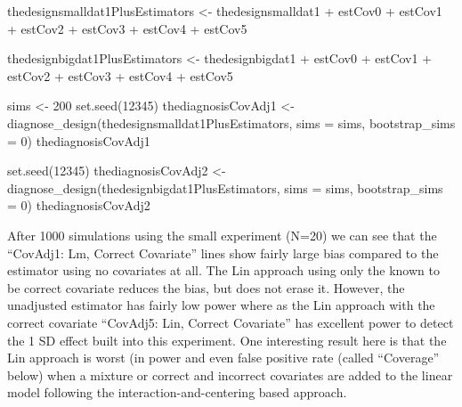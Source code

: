 \documentclass[
  12pt,
]{book}
\newenvironment{Shaded}{\begin{snugshade}}{\end{snugshade}}
\newcommand{\AttributeTok}[1]{\textcolor[rgb]{0.77,0.63,0.00}{#1}}
\newcommand{\DecValTok}[1]{\textcolor[rgb]{0.00,0.00,0.81}{#1}}
\newcommand{\FunctionTok}[1]{\textcolor[rgb]{0.00,0.00,0.00}{#1}}
\newcommand{\NormalTok}[1]{#1}
\newcommand{\OtherTok}[1]{\textcolor[rgb]{0.56,0.35,0.01}{#1}}
\newcommand{\SpecialCharTok}[1]{\textcolor[rgb]{0.00,0.00,0.00}{#1}}
\theoremstyle{definition}
\theoremstyle{definition}
\theoremstyle{definition}
\theoremstyle{remark}
\begin{document}
\begin{Shaded}
\begin{Highlighting}[]
\NormalTok{thedesignsmalldat1PlusEstimators }\OtherTok{\textless{}{-}}\NormalTok{ thedesignsmalldat1 }\SpecialCharTok{+}\NormalTok{ estCov0 }\SpecialCharTok{+}\NormalTok{ estCov1 }\SpecialCharTok{+}\NormalTok{ estCov2 }\SpecialCharTok{+}
\NormalTok{  estCov3 }\SpecialCharTok{+}\NormalTok{ estCov4 }\SpecialCharTok{+}\NormalTok{ estCov5}

\NormalTok{thedesignbigdat1PlusEstimators }\OtherTok{\textless{}{-}}\NormalTok{ thedesignbigdat1 }\SpecialCharTok{+}\NormalTok{ estCov0 }\SpecialCharTok{+}\NormalTok{ estCov1 }\SpecialCharTok{+}\NormalTok{ estCov2 }\SpecialCharTok{+}
\NormalTok{  estCov3 }\SpecialCharTok{+}\NormalTok{ estCov4 }\SpecialCharTok{+}\NormalTok{ estCov5}
\end{Highlighting}
\end{Shaded}

\begin{Shaded}
\begin{Highlighting}[]
\NormalTok{sims }\OtherTok{\textless{}{-}} \DecValTok{200}
\FunctionTok{set.seed}\NormalTok{(}\DecValTok{12345}\NormalTok{)}
\NormalTok{thediagnosisCovAdj1 }\OtherTok{\textless{}{-}} \FunctionTok{diagnose\_design}\NormalTok{(thedesignsmalldat1PlusEstimators, }\AttributeTok{sims =}\NormalTok{ sims, }\AttributeTok{bootstrap\_sims =} \DecValTok{0}\NormalTok{)}
\NormalTok{thediagnosisCovAdj1}
\end{Highlighting}
\end{Shaded}

\begin{Shaded}
\begin{Highlighting}[]
\FunctionTok{set.seed}\NormalTok{(}\DecValTok{12345}\NormalTok{)}
\NormalTok{thediagnosisCovAdj2 }\OtherTok{\textless{}{-}} \FunctionTok{diagnose\_design}\NormalTok{(thedesignbigdat1PlusEstimators, }\AttributeTok{sims =}\NormalTok{ sims, }\AttributeTok{bootstrap\_sims =} \DecValTok{0}\NormalTok{)}
\NormalTok{thediagnosisCovAdj2}
\end{Highlighting}
\end{Shaded}

After 1000 simulations using the small experiment (N=20) we can see that
the ``CovAdj1: Lm, Correct Covariate'' lines show fairly large bias
compared to the estimator using no covariates at all. The Lin approach
using only the known to be correct covariate reduces the bias, but does
not erase it. However, the unadjusted estimator has fairly low power
where as the Lin approach with the correct covariate ``CovAdj5: Lin,
Correct Covariate'' has excellent power to detect the 1 SD effect built
into this experiment. One interesting result here is that the Lin
approach is worst (in power and even false positive rate (called
``Coverage'' below) when a mixture or correct and incorrect covariates
are added to the linear model following the interaction-and-centering
based approach.
\end{document}
